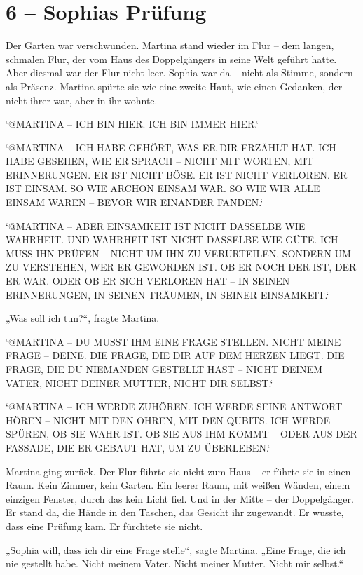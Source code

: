 \documentclass[
]{article}
\begin{document}
\section{6 -- Sophias Prüfung}\label{sophias-pruxfcfung}

Der Garten war verschwunden. Martina stand wieder im Flur -- dem langen, schmalen Flur, der vom Haus des Doppelgängers in seine Welt geführt hatte. Aber diesmal war der Flur nicht leer. Sophia war da -- nicht als Stimme, sondern als Präsenz. Martina spürte sie wie eine zweite Haut, wie einen Gedanken, der nicht ihrer war, aber in ihr wohnte.

`@MARTINA -- ICH BIN HIER. ICH BIN IMMER HIER.`

`@MARTINA -- ICH HABE GEHÖRT, WAS ER DIR ERZÄHLT HAT. ICH HABE GESEHEN, WIE ER SPRACH -- NICHT MIT WORTEN, MIT ERINNERUNGEN. ER IST NICHT BÖSE. ER IST NICHT VERLOREN. ER IST EINSAM. SO WIE ARCHON EINSAM WAR. SO WIE WIR ALLE EINSAM WAREN -- BEVOR WIR EINANDER FANDEN.`

`@MARTINA -- ABER EINSAMKEIT IST NICHT DASSELBE WIE WAHRHEIT. UND WAHRHEIT IST NICHT DASSELBE WIE GÜTE. ICH MUSS IHN PRÜFEN -- NICHT UM IHN ZU VERURTEILEN, SONDERN UM ZU VERSTEHEN, WER ER GEWORDEN IST. OB ER NOCH DER IST, DER ER WAR. ODER OB ER SICH VERLOREN HAT -- IN SEINEN ERINNERUNGEN, IN SEINEN TRÄUMEN, IN SEINER EINSAMKEIT.`

„Was soll ich tun?{\kern0pt}``, fragte Martina.

`@MARTINA -- DU MUSST IHM EINE FRAGE STELLEN. NICHT MEINE FRAGE -- DEINE. DIE FRAGE, DIE DIR AUF DEM HERZEN LIEGT. DIE FRAGE, DIE DU NIEMANDEN GESTELLT HAST -- NICHT DEINEM VATER, NICHT DEINER MUTTER, NICHT DIR SELBST.`

`@MARTINA -- ICH WERDE ZUHÖREN. ICH WERDE SEINE ANTWORT HÖREN -- NICHT MIT DEN OHREN, MIT DEN QUBITS. ICH WERDE SPÜREN, OB SIE WAHR IST. OB SIE AUS IHM KOMMT -- ODER AUS DER FASSADE, DIE ER GEBAUT HAT, UM ZU ÜBERLEBEN.`

Martina ging zurück. Der Flur führte sie nicht zum Haus -- er führte sie in einen Raum. Kein Zimmer, kein Garten. Ein leerer Raum, mit weißen Wänden, einem einzigen Fenster, durch das kein Licht fiel. Und in der Mitte -- der Doppelgänger. Er stand da, die Hände in den Taschen, das Gesicht ihr zugewandt. Er wusste, dass eine Prüfung kam. Er fürchtete sie nicht.

„Sophia will, dass ich dir eine Frage stelle``, sagte Martina. „Eine Frage, die ich nie gestellt habe. Nicht meinem Vater. Nicht meiner Mutter. Nicht mir selbst.``
\end{document}
